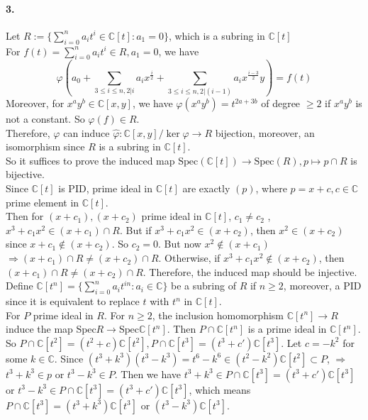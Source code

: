 \documentclass{article}
\begin{document}
\paragraph{3.}Let  $ R:=\{\sum\limits_{i=0}^n a_it^i\in \mathbb{C}[t]: a_1=0\} $, which is a subring in  $ \mathbb{C}[t] $ \\
For  $ f(t)=\sum\limits_{i=0}^n a_it^i\in R, a_1=0 $, we have 
\[\varphi(a_0+\sum\limits_{3 \leq i \leq n,2|i}a_ix^{\frac{i }{2}}+\sum\limits_{3 \leq i \leq n,2|(i-1)}a_ix^{\frac{i-3 }{2}}y)=f(t)\]
Moreover, for  $ x^ay^b\in \mathbb{C}[x,y] $, we have  $ \varphi (x^ay^b)=t^{2a+3b} $ of degree  $  \geq 2 $ if  $ x^ay^b  $ is not a constant. So  $ \varphi(f) \in R $.\\
Therefore,  $ \varphi  $ can induce  $ \hat{\varphi}:\mathbb{C}[x,y]/\ker \varphi\rightarrow R $ bijection, moreover, an isomorphism since  $ R  $ is a subring in  $ \mathbb{C}[t] $.\\
So it suffices to prove the induced map  $ \mathrm{Spec}(\mathbb{C}[t])\rightarrow \mathrm{Spec}(R), p\mapsto p\cap R $ is bijective.\\
Since  $ \mathbb{C}[t] $ is PID, prime ideal in  $ \mathbb{C}[t] $ are exactly  $ (p) $, where  $ p=x+c,c\in \mathbb{C} $ prime element in  $ \mathbb{C}[t] $.\\
Then for  $ (x+c_1),(x+c_2) $ prime ideal in  $ \mathbb{C}[t] $, $ c_1\not=c_2 $ ,  $ x^3+c_1x^2\in (x+c_1)\cap R $. But if $ x^3+c_1x^2\in (x+c_2) $, then  $ x^2\in(x+c_2) $ since $ x+c_1\not\in(x+c_2) $. So  $ c_2=0 $. But now  $ x^2\not\in (x+c_1) $ $ \Rightarrow (x+c_1)\cap R\not=(x+c_2)\cap R $. Otherwise, if  $ x^3+c_1x^2\not\in (x+c_2) $, then   $ (x+c_1)\cap R\not=(x+c_2)\cap R  $. Therefore, the induced map should be injective.\\
Define  $ \mathbb{C}[t^n]=\{\sum\limits_{i=0}^n a_i t^{in}:a_i\in \mathbb{C}\} $ be a subring of  $ R $ if  $ n \geq 2 $, moreover, a PID since it is equivalent to replace  $ t  $ with  $ t^n  $ in  $ \mathbb{C}[t] $. \\
For  $ P  $ prime ideal in  $ R $. For  $ n \geq 2 $, the inclusion homomorphism  $ \mathbb{C}[t^n] \rightarrow R $  induce the map  $ \mathrm{Spec}R\rightarrow \mathrm{Spec}\mathbb{C}[t^n]$. Then  $ P\cap \mathbb{C}[t^n]  $ is a prime ideal in  $ \mathbb{C}[t^n] $. So  $ P\cap \mathbb{C}[t^2]=(t^2+c)\mathbb{C}[t^2],P\cap \mathbb{C}[t^3]=(t^3+c')\mathbb{C}[t^3] $. Let  $ c=-k^2 $ for some  $ k\in \mathbb{C} $. Since  $ (t^3+k^3)(t^3-k^3)=t^6-k^6\in (t^2-k^2)\mathbb{C}[t^2]\subset P $, $ \Rightarrow  $  $ t^3+k^3\in p$ or $ t^3-k^3\in P $. Then we have  $ t^3+k^3\in P\cap\mathbb{C}[t^3]=(t^3+c')\mathbb{C}[t^3] $ or  $ t^3-k^3\in P\cap\mathbb{C}[t^3]=(t^3+c')\mathbb{C}[t^3] $, which means  $ P\cap \mathbb{C}[t^3]=(t^3+k^3)\mathbb{C}[t^3] $ or  $ (t^3-k^3)\mathbb{C}[t^3] $.\\
\end{document}
